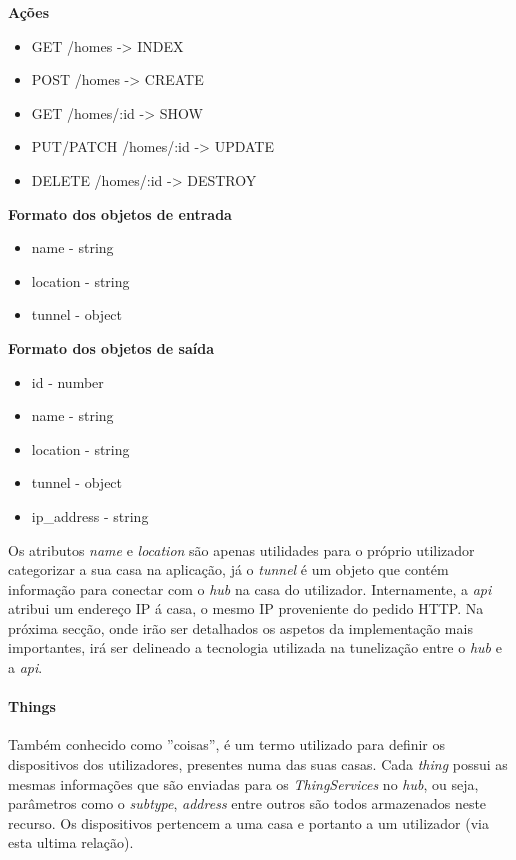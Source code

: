 \textbf{Ações}
\begin{itemize}
    \item GET /homes -> INDEX
    \item POST /homes -> CREATE
    \item GET /homes/:id -> SHOW
    \item PUT/PATCH /homes/:id -> UPDATE
    \item DELETE /homes/:id -> DESTROY
\end{itemize}

\textbf{Formato dos objetos de entrada}
\begin{itemize}
    \item name - string
    \item location - string
    \item tunnel - object
\end{itemize}

\textbf{Formato dos objetos de saída}
\begin{itemize}
    \item id - number
    \item name - string
    \item location - string
    \item tunnel - object
    \item ip\_address - string
\end{itemize}

Os atributos \textit{name} e \textit{location} são apenas utilidades para o próprio utilizador categorizar a sua casa na aplicação, já o \textit{tunnel} é um objeto que contém informação para conectar com o \textit{hub} na casa do utilizador. Internamente, a \textit{api} atribui um endereço IP á casa, o mesmo IP proveniente do pedido HTTP. Na próxima secção, onde irão ser detalhados os aspetos da implementação mais importantes, irá ser delineado a tecnologia utilizada na tunelização entre o \textit{hub} e a \textit{api}.

\paragraph*{Things}

Também conhecido como ''coisas'', é um termo utilizado para definir os dispositivos dos utilizadores, presentes numa das suas casas. Cada \textit{thing} possui as mesmas informações que são enviadas para os \textit{ThingServices} no \textit{hub}, ou seja, parâmetros como o \textit{subtype}, \textit{address} entre outros são todos armazenados neste recurso. Os dispositivos pertencem a uma casa e portanto a um utilizador (via esta ultima relação).

